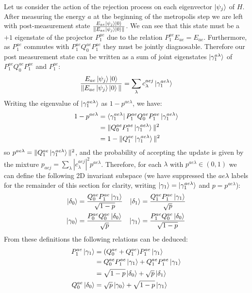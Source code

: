 \documentclass[aps,floatfix,10pt,amssymb,amsfont,amsmath,superscriptaddress,float,nofootinbib,longbibliography,nobalancelastpage,twocolumn]{revtex4-2}
\begin{document}
Let us consider the action of the rejection process on each eigenvector $\ket{\psi_j}$ of $H$. After measuring the energy $a$ at the beginning of the metropolis step we are left with post-measurement state $\frac{E_{ae}\ket{\psi_j}\ket{0}}{\|E_{ae} \ket{\psi_j}\ket{0}\|}$. We can see that this state must be a $+1$ eigenstate of the projector $P^{ae}_1$ due to the relation $P_1^{ae}E_{ae} = E_{ae}$.  Furthermore, as $P_1^{ae}$ commutes with $P^{ae}_1Q^{ae}_0P^{ae}_1$ they must be jointly diagnosable. Therefore our post measurement state can be written as a sum of joint eigenstates $\ket{\gamma_1^{a \lambda}}$ of $P^{ae}_1Q^{ae}_0P^{ae}_1$ and $P_1^{ae}$:
\begin{equation}
    \frac{E_{ae}\ket{\psi_j}\ket{0}}{\|E_{ae} \ket{\psi_j}\ket{0}\|} = \sum_{\lambda} c_{\lambda}^{aej}\ket{\gamma_1^{ae \lambda}}
\end{equation}
Writing the eigenvalue of $\ket{\gamma^{ae\lambda}_1}$ as $1-p^{ae\lambda}$, we have: \begin{align}1-p^{ae\lambda}&=\bra{\gamma^{ae\lambda}_1}P^{ae}_1Q^{ae}_0P^{ae}_1\ket{\gamma^{ae\lambda}_1} \\&=\|Q^{ae}_0P^{ae}_1\ket{\gamma^{ae\lambda}_1}\|^2\\ &= 1-\|Q^{ae}_1\ket{\gamma^{ae\lambda}_1}\|^2
\end{align}
so $p^{ae\lambda} = \|Q^{ae}_1\ket{\gamma^{ae\lambda}_1}\|^2$, and the probability of accepting the update is given by the mixture $p_{aej} = \sum_{\lambda}|c^{aej}_{\lambda}|^2p^{ae\lambda}$. Therefore, for each $\lambda$ with $p^{ae\lambda} \in (0,1)$ we can define the following 2D invariant subspace (we have suppressed the $ae\lambda$ labels for the remainder of this section for clarity, writing $\ket{\gamma_1} = \ket{\gamma^{ae\lambda}_1}$ and $p = p^{ae\lambda}$):
\begin{align}
    \ket{\delta_0} &= \frac{Q^{ae}_0P^{ae}_1\ket{\gamma_1}}{\sqrt{1-p}} &\ket{\delta_1} &= \frac{Q^{ae}_1P^{ae}_1\ket{\gamma_1}}{\sqrt{p}} \\
    \ket{\gamma_0} &= \frac{P^{ae}_0Q^{ae}_0\ket{\delta_0}}{\sqrt{p}} &\ket{\gamma_1} &= \frac{P^{ae}_1Q^{ae}_0\ket{\delta_0}}{\sqrt{1-p}}
\end{align}
From these definitions the following relations can be deduced:
\begin{align}
\begin{split}
\label{eq:deltagamma0}
    P^{ae}_1 \ket{\gamma_1} &= (Q^{ae}_0+Q^{ae}_1)P^{ae}_1 \ket{\gamma_1}\\
    &= Q^{ae}_0P^{ae}_1 \ket{\gamma_1}+Q^{ae}_1P^{ae}_1 \ket{\gamma_1}\\
    &= \sqrt{1-p} \ket{\delta_0} + \sqrt{p}\ket{\delta_1}\\
    Q^{ae}_0\ket{\delta_0} &= \sqrt{p} \ket{\gamma_0} + \sqrt{1-p} \ket{\gamma_1}
\end{split}
\end{align}
\end{document}
